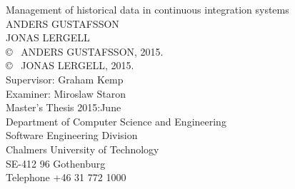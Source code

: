 \newpage
\thispagestyle{plain}
\vspace*{4.5cm}
Management of historical data in continuous integration systems\\
ANDERS GUSTAFSSON\\
JONAS LERGELL\\[0.5cm]

\copyright ~ ANDERS GUSTAFSSON, 2015.\\
\copyright ~ JONAS LERGELL, 2015.\\[0.5cm]

Supervisor: Graham Kemp \\
Examiner: Miroslaw Staron \\[0.5cm]

Master's Thesis 2015:June\\
Department of Computer Science and Engineering\\
Software Engineering Division\\
Chalmers University of Technology\\
SE-412 96 Gothenburg\\
Telephone +46 31 772 1000\\

\vfill

